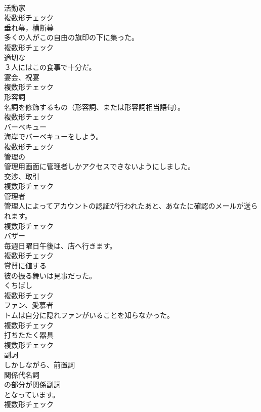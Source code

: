 \documentclass[8pt]{extreport}
\begin{document}
\begin{CJK}{UTF8}{min}
\\	[名詞]	活動家	
\\	複数形チェック
\\	[名詞]	垂れ幕，横断幕	
\\	多くの人がこの自由の旗印の下に集った。	
\\	複数形チェック
\\	[形容詞]	適切な	
\\	３人にはこの食事で十分だ。	
\\	[名詞]	宴会、祝宴	
\\	複数形チェック
\\	[名詞]	形容詞	
\\	名詞を修飾するもの（形容詞、または形容詞相当語句）。	
\\	複数形チェック
\\	[名詞]	バーベキュー	
\\	海岸でバーベキューをしよう。	
\\	複数形チェック
\\	[形容詞]	管理の	
\\	管理用画面に管理者しかアクセスできないようにしました。	
\\	[名詞]	交渉、取引	
\\	複数形チェック
\\	[名詞]	管理者	
\\	管理人によってアカウントの認証が行われたあと、あなたに確認のメールが送られます。	
\\	複数形チェック
\\	[名詞]	バザー	
\\	毎週日曜日午後は、店へ行きます。	
\\	複数形チェック
\\	[形容詞]	賞賛に値する	
\\	彼の振る舞いは見事だった。	
\\	[名詞]	くちばし	
\\	複数形チェック
\\	[名詞]	ファン、愛慕者	
\\	トムは自分に隠れファンがいることを知らなかった。	
\\	複数形チェック
\\	[名詞]	打ちたたく器具	
\\	複数形チェック
\\	[名詞]	副詞	
\\	しかしながら、前置詞
\\	関係代名詞
\\	の部分が関係副詞
\\	となっています。	
\\	複数形チェック

\end{CJK}
\end{document}
